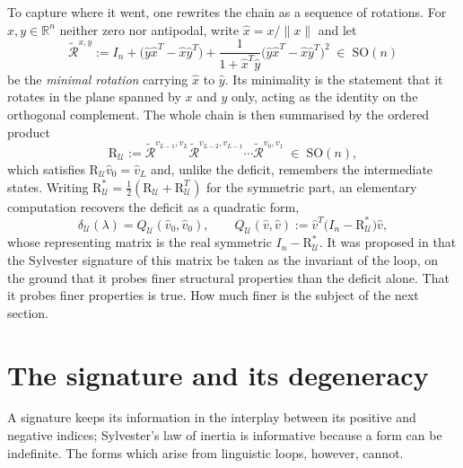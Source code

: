 \documentclass[11pt,a4paper]{article}
\theoremstyle{plain}
\theoremstyle{definition}
\numberwithin{equation}{section}
\newcommand{\R}{\mathbb{R}}
\newcommand{\SO}{\mathrm{SO}}
\newcommand{\Rmin}{\widetilde{\mathcal{R}}}
\newcommand{\Uc}{\mathcal{U}}
\begin{document}
To capture where it went, one rewrites the chain as a sequence of
rotations. For $x,y \in \R^n$ neither zero nor antipodal, write
$\hat{x} = x/\|x\|$ and let
\begin{equation}\label{eq:minrot}
\Rmin^{x,y} := I_n + \bigl(\hat{y}\hat{x}^T - \hat{x}\hat{y}^T\bigr)
+ \frac{1}{1 + \hat{x}^T\hat{y}}
\bigl(\hat{y}\hat{x}^T - \hat{x}\hat{y}^T\bigr)^2 \; \in \; \SO(n)
\end{equation}
be the \emph{minimal rotation} carrying $\hat{x}$ to $\hat{y}$. Its
minimality is the statement that it rotates in the plane spanned by $x$
and $y$ only, acting as the identity on the orthogonal complement. The
whole chain is then summarised by the ordered product
\begin{equation}\label{eq:loopmatrix}
\mathrm{R}_\Uc := \Rmin^{v_{L-1},v_L} \Rmin^{v_{L-2},v_{L-1}}
\cdots \Rmin^{v_0,v_1} \; \in \; \SO(n),
\end{equation}
which satisfies $\mathrm{R}_\Uc \hat{v}_0 = \hat{v}_L$ and, unlike the
deficit, remembers the intermediate states. Writing
$\mathrm{R}^{*}_\Uc = \tfrac12(\mathrm{R}_\Uc + \mathrm{R}_\Uc^T)$ for
the symmetric part, an elementary computation recovers the deficit as a
quadratic form,
\begin{equation}\label{eq:quadform}
\delta_\Uc(\lambda) = Q_\Uc(\hat{v}_0,\hat{v}_0),
\qquad
Q_\Uc(\hat{v},\hat{v}) := \hat{v}^T
\bigl(I_n - \mathrm{R}^{*}_\Uc\bigr)\hat{v},
\end{equation}
whose representing matrix is the real symmetric
$I_n - \mathrm{R}^{*}_\Uc$. It was proposed in \cite{CM25} that the
Sylvester signature of this matrix be taken as the invariant of the
loop, on the ground that it probes finer structural properties than the
deficit alone. That it probes finer properties is true. How much finer
is the subject of the next section.

\section{The signature and its degeneracy}\label{sec:signature}

A signature keeps its information in the interplay between its positive
and negative indices; Sylvester's law of inertia is informative because
a form can be indefinite. The forms which arise from linguistic loops,
however, cannot.
\end{document}
